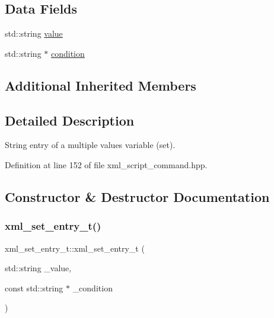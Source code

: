 \subsection*{Data Fields}
\begin{DoxyCompactItemize}
\item 
std\+::string \hyperlink{classxml__set__entry__t_a910d6952281faf87b1c65c8b6f8ed926}{value}
\item 
std\+::string $\ast$ \hyperlink{classxml__set__entry__t_a81c2aba735a02aa3d388783a30fe104f}{condition}
\end{DoxyCompactItemize}
\subsection*{Additional Inherited Members}


\subsection{Detailed Description}
String entry of a multiple values variable (set). 

Definition at line 152 of file xml\+\_\+script\+\_\+command.\+hpp.



\subsection{Constructor \& Destructor Documentation}
\mbox{\label{classxml__set__entry__t_af48daac83f7a26fb95dcf3fd8cc72d34}} 
\subsubsection{\texorpdfstring{xml\+\_\+set\+\_\+entry\+\_\+t()}{xml\_set\_entry\_t()}\hspace{0.1cm}{\footnotesize\ttfamily [1/2]}}
{\footnotesize\ttfamily xml\+\_\+set\+\_\+entry\+\_\+t\+::xml\+\_\+set\+\_\+entry\+\_\+t (\begin{DoxyParamCaption}\item[{std\+::string}]{\+\_\+value,  }\item[{const std\+::string $\ast$}]{\+\_\+condition }\end{DoxyParamCaption})}




